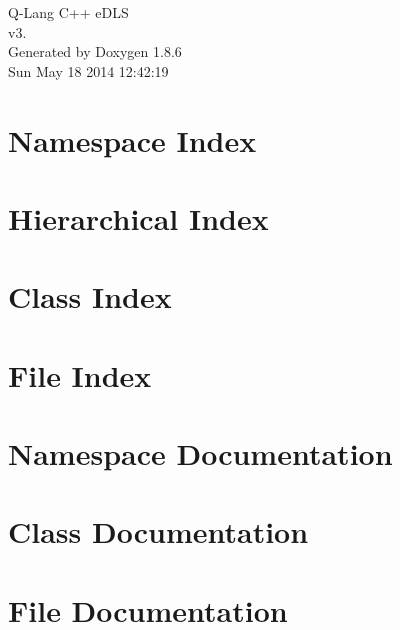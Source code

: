 \documentclass[twoside]{book}
\newcommand{\clearemptydoublepage}{%
  \newpage{\pagestyle{empty}\cleardoublepage}%
}
\begin{document}
\hypersetup{pageanchor=false}
\begin{titlepage}
\vspace*{7cm}
\begin{center}%
{\Large Q-\/\-Lang C++ e\-D\-L\-S \\[1ex]\large v3. }\\
\vspace*{1cm}
{\large Generated by Doxygen 1.8.6}\\
\vspace*{0.5cm}
{\small Sun May 18 2014 12:42:19}\\
\end{center}
\end{titlepage}
\clearemptydoublepage
\tableofcontents
\clearemptydoublepage
{}
\hypersetup{pageanchor=true}

\chapter{Namespace Index}

\chapter{Hierarchical Index}

\chapter{Class Index}

\chapter{File Index}

\chapter{Namespace Documentation}



\chapter{Class Documentation}



















\chapter{File Documentation}



\newpage
{}
{}
\printindex
\end{document}
